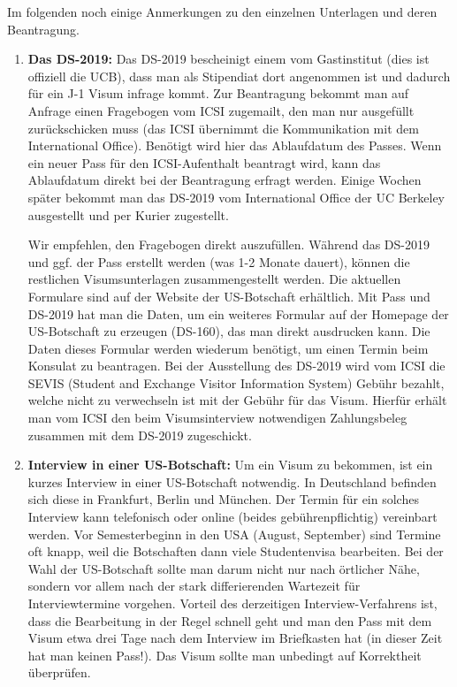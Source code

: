 \documentclass[a4paper]{scrreprt}
\begin{document}
Im folgenden noch einige Anmerkungen zu den einzelnen Unterlagen und deren Beantragung.

\begin{enumerate}
	\item \textbf{Das DS-2019:} Das DS-2019 bescheinigt einem vom Gastinstitut (dies ist offiziell die UCB), dass man als Stipendiat dort angenommen ist und dadurch für ein J-1 Visum infrage kommt. Zur Beantragung bekommt man auf Anfrage einen Fragebogen vom ICSI zugemailt, den man nur ausgefüllt zurückschicken muss (das ICSI übernimmt die Kommunikation mit dem International Office). Benötigt wird hier das Ablaufdatum des Passes. Wenn ein neuer Pass für den ICSI-Aufenthalt beantragt wird, kann das Ablaufdatum direkt bei der Beantragung erfragt werden. Einige Wochen später bekommt man das DS-2019 vom International Office der UC Berkeley ausgestellt und per Kurier zugestellt.
	
	Wir empfehlen, den Fragebogen direkt auszufüllen. Während das DS-2019 und ggf. der Pass erstellt werden (was 1-2 Monate dauert), können die restlichen Visumsunterlagen zusammengestellt werden. Die aktuellen Formulare sind auf der Website der US-Botschaft erhältlich. Mit Pass und DS-2019 hat man die Daten, um ein weiteres Formular auf der Homepage der US-Botschaft zu erzeugen (DS-160), das man direkt ausdrucken kann. Die Daten dieses Formular werden wiederum benötigt, um einen Termin beim Konsulat zu beantragen. Bei der Ausstellung des DS-2019 wird vom ICSI die SEVIS (Student and Exchange Visitor Information System) Gebühr bezahlt, welche nicht zu verwechseln ist mit der Geb\"uhr f\"ur das Visum. Hierfür erhält man vom ICSI den beim Visumsinterview notwendigen Zahlungsbeleg zusammen mit dem DS-2019 zugeschickt.

	\item \textbf{Interview in einer US-Botschaft:} Um ein Visum zu bekommen, ist ein kurzes Interview in einer US-Botschaft notwendig. In Deutschland befinden sich diese in Frankfurt, Berlin und München. Der Termin für ein solches Interview kann telefonisch oder online (beides gebührenpflichtig) vereinbart werden. Vor Semesterbeginn in den USA (August, September) sind Termine oft knapp, weil die Botschaften dann viele Studentenvisa bearbeiten. Bei der Wahl der US-Botschaft sollte man darum nicht nur nach örtlicher Nähe, sondern vor allem nach der stark differierenden Wartezeit für Interviewtermine vorgehen. Vorteil des derzeitigen Interview-Verfahrens ist, dass die Bearbeitung in der Regel schnell geht und man den Pass mit dem Visum etwa drei Tage nach dem Interview im Briefkasten hat (in dieser Zeit hat man keinen Pass!). Das Visum sollte man unbedingt auf Korrektheit überprüfen.
	

\end{enumerate}
\end{document}
